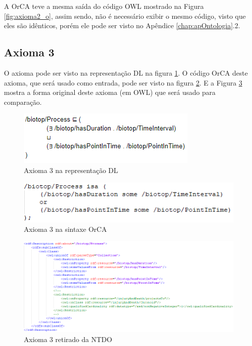 \documentclass{bcc}
\begin{document}
A OrCA teve a mesma saída do código OWL mostrado na Figura \ref{fig:axioma2_o}, assim sendo, não é necessário exibir o mesmo código, visto que eles são idênticos, porém ele pode ser visto no Apêndice \ref{chap:apOntologia}.2.

\subsection{Axioma 3}
O axioma pode ser visto na representação DL na figura \ref{fig:axioma3_dl}. O código OrCA deste axioma, que será usado como entrada, pode ser visto na figura \ref{fig:axioma3_orca}. E a Figura \ref{fig:axioma3_o} mostra a forma original deste axioma (em OWL) que será usado para comparação. 

\begin{figure}[H]
\centering
\includegraphics[width=.5\textwidth]{Figuras/axioma3_dl.png}
\caption{Axioma 3 na representação DL} 
\label{fig:axioma3_dl}
\end{figure}

\begin{figure}[H]
\centering
\includegraphics[width=.7\textwidth]{Figuras/axioma3_orca.png}
\caption{Axioma 3 na sintaxe OrCA} 
\label{fig:axioma3_orca}
\end{figure}

\begin{figure}[H]
\centering
\includegraphics[width=.9\textwidth]{Figuras/axioma3_o.png}
\caption{Axioma 3 retirado da NTDO} 
\label{fig:axioma3_o}
\end{figure}
\end{document}
